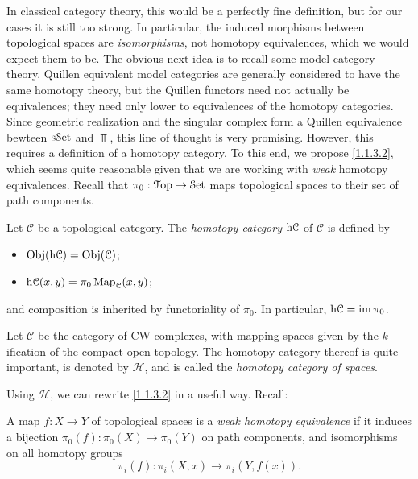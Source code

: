 In classical category theory, this would be a perfectly fine definition, but for our cases it is still too strong. In particular, the induced morphisms between topological spaces are \emph{isomorphisms}, not homotopy equivalences, which we would expect them to be. The obvious next idea is to recall some model category theory. Quillen equivalent model categories are generally considered to have the same homotopy theory, but the Quillen functors need not actually be equivalences; they need only lower to equivalences of the homotopy categories. Since geometric realization and the singular complex form a Quillen equivalence bewteen $\mathrm{s}\mathcal{S}\mathrm{et} $ and $\Top $, this line of thought is very promising. However, this requires a definition of a homotopy category. To this end, we propose \cref{1.1.3.2}, which seems quite reasonable given that we are working with \emph{weak} homotopy equivalences. Recall that $\pi_0 : \mathcal{T}\mathrm{op}  \to \mathcal{S}\mathrm{et} $ maps topological spaces to their set of path components.

\begin{definition}\label{1.1.3.2}
	Let $\mathcal{C} $ be a topological category. The \emph{homotopy category} $\mathrm{h}\mathcal{C} $ of $\mathcal{C} $ is defined by
	\begin{itemize}
		\item $\operatorname{Obj}(\mathrm{h}\mathcal{C} ) =\operatorname{Obj}(\mathcal{C} ) $;
		\item $\mathrm{h}\mathcal{C} (x,y)=\pi_0 \operatorname{Map} _\mathcal{C} (x,y)$;
	\end{itemize}
	and composition is inherited by functoriality of $\pi_0$. In particular, $\mathrm{h}\mathcal{C} =\operatorname{im}\pi_0$.
\end{definition}

\begin{example}\label{1.1.3.3}
	Let $\mathcal{C} $ be the category of CW complexes, with mapping spaces given by the $k$-ification of the compact-open topology. The homotopy category thereof is quite important, is denoted by $\mathcal{H} $, and is called the \emph{homotopy category of spaces}.
\end{example}

Using $\mathcal{H} $, we can rewrite \cref{1.1.3.2} in a useful way. Recall:

\begin{definition}\label{1.1.3.4}
	A map $f : X \to Y$ of topological spaces is a \emph{weak homotopy equivalence} if it induces a bijection $\pi_0(f): \pi_0(X) \to \pi_0(Y)$ on path components, and isomorphisms on all homotopy groups
	\[
		\pi_i(f) : \pi_i(X,x) \to \pi_i(Y,f(x))
	.\]
\end{definition}

